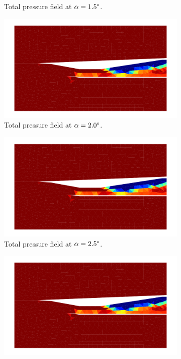 \begin{figure}[h]
\begin{subfigure}[h]{0.32\linewidth}
        \caption{Total pressure field at $\alpha=1.5\degree$.}
    \end{subfigure}

    \begin{subfigure}[h]{0.32\linewidth}
        \centering
        \includegraphics[width=\linewidth]{rep/q5/pt_a20.pdf}
        \caption{Total pressure field at $\alpha=2.0\degree$.}
    \end{subfigure}
    \begin{subfigure}[h]{0.32\linewidth}
        \centering
        \includegraphics[width=\linewidth]{rep/q5/pt_a25.pdf}
        \caption{Total pressure field at $\alpha=2.5\degree$.}
    \end{subfigure}
    \begin{subfigure}[h]{0.32\linewidth}
        \centering
        \includegraphics[width=\linewidth]{rep/q5/pt_a30.pdf}

\end{subfigure}
\end{figure}
